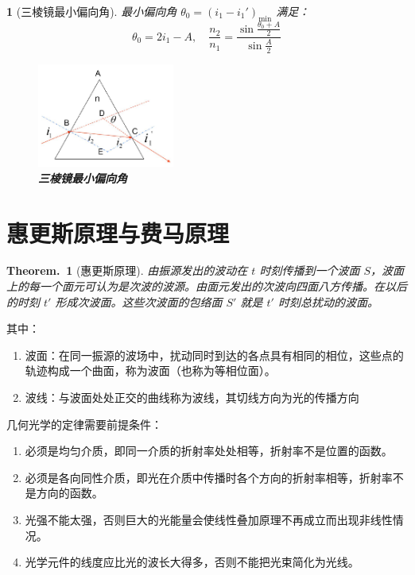 \documentclass[UTF8]{report}
\theoremstyle{MyLineTheoremStyle} %
\newtheorem{LineTheorem}{Theorem.\,}
\theoremstyle{MyBlockTheoremStyle} %
\theoremstyle{MySubsubsectionStyle} %
\newtheorem{definition}{}
\begin{document}
\begin{definition}[三棱镜最小偏向角]

最小偏向角 $\theta_0 = (i_1 - i_1')_{\text{min}}$ 满足：
\begin{equation}
    \theta_0 = 2i_1 - A, \quad \frac{n_2}{n_1} = \frac{\sin\frac{\theta_0+A}2}{\sin\frac A2}
\end{equation}

\begin{figure}[H]\centering
\includegraphics[width=0.4\textwidth]{assets/1,2/image (45).jpg}
\caption{\textbf{三棱镜最小偏向角}}\label{三棱镜最小偏向角}
\end{figure}

\end{definition}

\section{惠更斯原理与费马原理}

\begin{LineTheorem}[惠更斯原理]\label{LineTheorem: 惠更斯原理}
    由振源发出的波动在 $t$ 时刻传播到一个波面 $S$，波面上的每一个面元可认为是次波的波源。由面元发出的次波向四面八方传播。在以后的时刻 $t'$ 形成次波面。这些次波面的包络面 $S'$ 就是 $t'$ 时刻总扰动的波面。
\end{LineTheorem}

\noindent 其中：
\begin{enumerate}
    \item 波面：在同一振源的波场中，扰动同时到达的各点具有相同的相位，这些点的轨迹构成一个曲面，称为波面（也称为等相位面）。
    \item 波线：与波面处处正交的曲线称为波线，其切线方向为光的传播方向
\end{enumerate}

\noindent 几何光学的定律需要前提条件：
\begin{enumerate}
\item 必须是均匀介质，即同一介质的折射率处处相等，折射率不是位置的函数。
\item 必须是各向同性介质，即光在介质中传播时各个方向的折射率相等，折射率不是方向的函数。
\item 光强不能太强，否则巨大的光能量会使线性叠加原理不再成立而出现非线性情况。
\item 光学元件的线度应比光的波长大得多，否则不能把光束简化为光线。
\end{enumerate}
\end{document}

